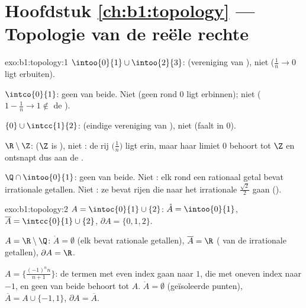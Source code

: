 \section*{Hoofdstuk \ref{ch:b1:topology} --- Topologie van de reële rechte}

\begin{solution}{exo:b1:topology:1}
$\intoo{0}{1} \cup \intoo{2}{3}$:  (vereniging van ), niet  ($\frac 1n \to 0$ ligt erbuiten).

$\intco{0}{1}$: geen van beide. Niet  (geen  rond $0$ ligt
erbinnen); niet  ($1 - \frac1n \to 1 \notin$ de ).

$\{0\} \cup \intcc{1}{2}$:  (eindige vereniging van ), niet  (faalt in $0$).

$\R \setminus \Z$:  ($\Z$ is ), niet : de rij
$\bigl(\frac 1n\bigr)$ ligt erin, maar haar limiet $0$ behoort tot $\Z$
en ontsnapt dus aan de .

$\Q \cap \intoo{0}{1}$: geen van beide. Niet : elk  rond een
rationaal getal bevat irrationale getallen. Niet : ze bevat rijen
die naar het irrationale $\frac{\sqrt 2}{2}$ gaan ().
\end{solution}

\begin{solution}{exo:b1:topology:2}
$A = \intoc{0}{1} \cup \{2\}$: $\mathring A = \intoo{0}{1}$, $\overline A
= \intcc{0}{1} \cup \{2\}$, $\partial A = \{0, 1, 2\}$.

$A = \R \setminus \Q$: $\mathring A = \emptyset$ (elk  bevat
rationale getallen), $\overline A = \R$ ( van de irrationale
getallen), $\partial A = \R$.

$A = \bigl\{\frac{(-1)^n n}{n+1}\bigr\}$: de termen met even index gaan
naar $1$, die met oneven index naar $-1$, en geen van beide behoort tot
$A$. $\mathring A = \emptyset$ (geïsoleerde punten), $\overline A = A
\cup \{-1, 1\}$, $\partial A = \overline A$.
\end{solution}

